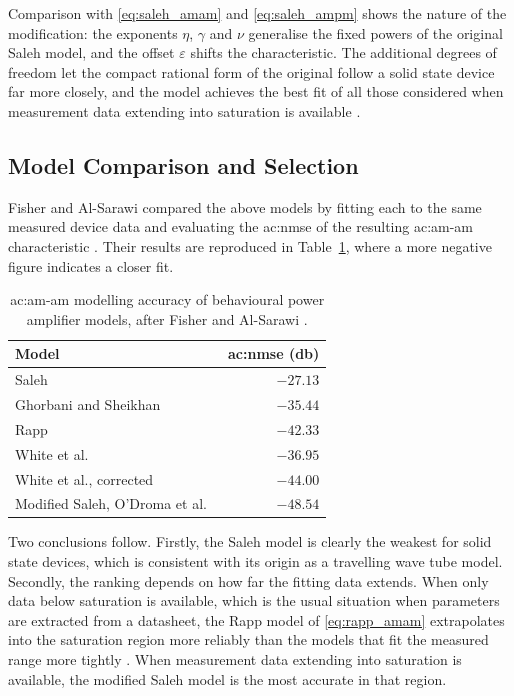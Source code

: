 Comparison with \eqref{eq:saleh_amam} and \eqref{eq:saleh_ampm} shows the nature of the modification: the exponents $\eta$, $\gamma$ and $\nu$ generalise the fixed powers of the original Saleh model, and the offset $\varepsilon$ shifts the characteristic. The additional degrees of freedom let the compact rational form of the original follow a solid state device far more closely, and the model achieves the best fit of all those considered when measurement data extending into saturation is available \cite{fisher}.

\subsection{Model Comparison and Selection}\label{sec:pa_model_selection}

Fisher and Al-Sarawi compared the above models by fitting each to the same measured device data and evaluating the \gls{ac:nmse} of the resulting \gls{ac:am-am} characteristic \cite{fisher}. Their results are reproduced in Table~\ref{table:pa_model_nmse}, where a more negative figure indicates a closer fit.

\begin{table}[tb]
  \caption{\gls{ac:am-am} modelling accuracy of behavioural power amplifier models, after
           Fisher and Al-Sarawi \cite{fisher}.}
  \label{table:pa_model_nmse}
  \begin{center}
    \begin{tabular}{l|r}
      Model & \gls{ac:nmse} (\unit{\decibel}) \\
      \hline
      Saleh \cite{saleh}                        & $-27.13$ \\
      Ghorbani and Sheikhan \cite{ghorbani}     & $-35.44$ \\
      Rapp \cite{rapp}                          & $-42.33$ \\
      White et al.\ \cite{white}                & $-36.95$ \\
      White et al., corrected \cite{fisher}     & $-44.00$ \\
      Modified Saleh, O'Droma et al.\ \cite{odroma} & $-48.54$ \\
    \end{tabular}
  \end{center}
\end{table}

Two conclusions follow. Firstly, the Saleh model is clearly the weakest for solid state devices, which is consistent with its origin as a travelling wave tube model. Secondly, the ranking depends on how far the fitting data extends. When only data below saturation is available, which is the usual situation when parameters are extracted from a datasheet, the Rapp model of \eqref{eq:rapp_amam} extrapolates into the saturation region more reliably than the models that fit the measured range more tightly \cite{fisher}. When measurement data extending into saturation is available, the modified Saleh model is the most accurate in that region.

